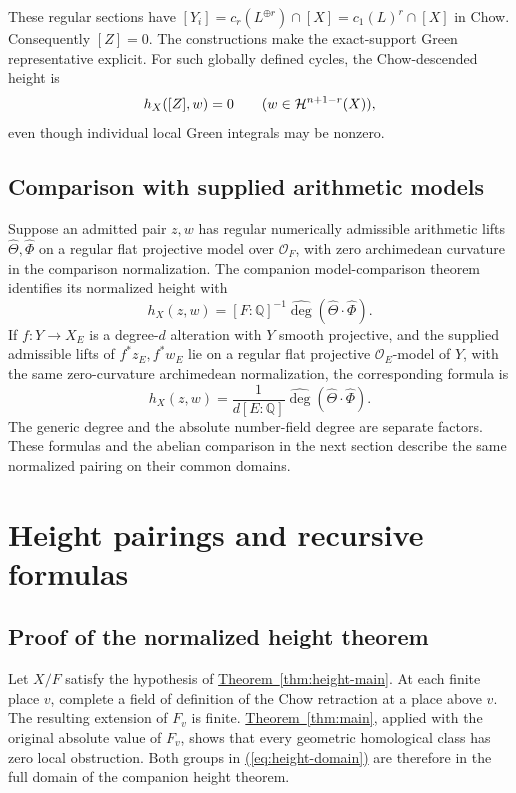 \documentclass[11pt,a4paper]{article}
\theoremstyle{definition}
\theoremstyle{remark}\newtheorem{remark}[theorem]{Remark}
\numberwithin{equation}{section}
\newcommand{\Q}{\mathbb Q}\newcommand{\R}{\mathbb R}\newcommand{\C}{\mathbb C}
\newcommand{\thmref}[1]{\hyperref[#1]{\textcolor{resultlink}{Theorem~\ref*{#1}}}}
\renewcommand{\eqref}[1]{\hyperref[#1]{\textcolor{equationlink}{(\ref*{#1})}}}
\begin{document}
These regular sections have
$[Y_i]=c_r(L^{\oplus r})\cap[X]=c_1(L)^r\cap[X]$ in Chow.
Consequently $[Z]=0$. The constructions make the exact-support
Green representative explicit. For such globally defined cycles,
the Chow-descended height is
\[
 h_X([Z],w)=0\qquad(w\in\mathcal H^{n+1-r}(X)),
\]
even though individual local Green integrals may be nonzero.

\subsection{Comparison with supplied arithmetic models}\label{sub:supplied-models}

Suppose an admitted pair $z,w$ has regular numerically admissible
arithmetic lifts $\widehat\Theta,\widehat\Phi$ on a regular flat
projective model over $\mathcal O_F$, with zero archimedean
curvature in the comparison normalization. The companion
model-comparison theorem \cite{InternalHeight} identifies its
normalized height with
\[
 h_X(z,w)=[F:\Q]^{-1}
          \widehat{\deg}(\widehat\Theta\cdot\widehat\Phi).
\]
If $f:Y\to X_E$ is a degree-$d$ alteration with $Y$ smooth
projective, and the supplied admissible lifts of
$f^*z_E,f^*w_E$ lie on a regular flat projective
$\mathcal O_E$-model of $Y$, with the same zero-curvature
archimedean normalization, the corresponding formula is
\[
 h_X(z,w)=\frac{1}{d[E:\Q]}
          \widehat{\deg}(\widehat\Theta\cdot\widehat\Phi).
\]
The generic degree and the absolute number-field degree are separate
factors. These formulas and the abelian comparison in the next
section describe the same normalized pairing on their common domains.



\section{Height pairings and recursive formulas}\label{sec:heights}

\subsection{Proof of the normalized height theorem}\label{proof:height}

Let $X/F$ satisfy the hypothesis of \thmref{thm:height-main}.
At each finite place $v$, complete a field of definition of
the Chow retraction at a place above $v$. The resulting
extension of $F_v$ is finite. \thmref{thm:main}, applied with
the original absolute value of $F_v$, shows that every geometric
homological class has zero local obstruction. Both groups in
\eqref{eq:height-domain} are therefore in the full domain of
the companion height theorem.
\end{document}
